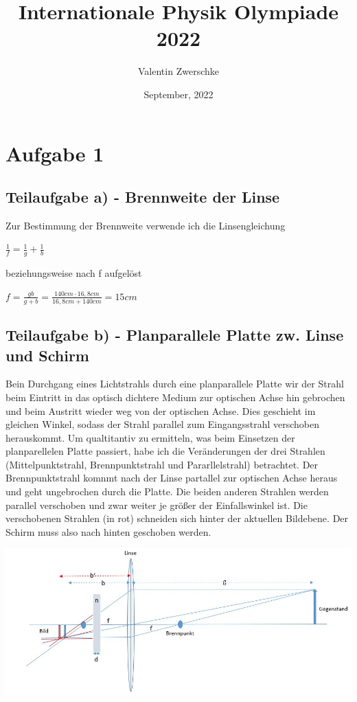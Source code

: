 \documentclass{article}
\title{Internationale Physik Olympiade 2022}
\author{Valentin Zwerschke}
\date{September, 2022}
\begin{document}
\maketitle
\section*{Aufgabe 1}
\subsection*{Teilaufgabe a) - Brennweite der Linse}
Zur Bestimmung der Brennweite verwende ich die Linsengleichung
\begin{center}
	$\frac{1}{f}=\frac{1}{g}+\frac{1}{b}$
\end{center}
beziehungsweise nach f aufgelöst
\begin{center}
	$f=\frac{gb}{g+b}=\frac{140cm\cdot16,8cm}{16,8cm+140cm}=15cm$
\end{center}
\subsection*{Teilaufgabe b) - Planparallele Platte zw. Linse und Schirm}
Bein Durchgang eines Lichtstrahls durch eine planparallele Platte wir der Strahl beim Eintritt in das optisch dichtere
Medium zur optischen Achse hin gebrochen und beim Austritt wieder weg von der optischen Achse. Dies geschieht im gleichen Winkel, 
sodass der Strahl parallel zum Eingangsstrahl verschoben herauskommt.   
Um qualtitantiv zu ermitteln, was beim Einsetzen der planparellelen Platte passiert, habe ich die Veränderungen der drei Strahlen (Mittelpunktstrahl, Brennpunktstrahl und Pararllelstrahl) betrachtet.
Der Brennpunktstrahl komnmt nach der Linse partallel zur optischen Achse heraus und geht ungebrochen durch die Platte. Die beiden anderen Strahlen werden parallel verschoben und zwar weiter je größer der Einfallswinkel ist. 
Die verschobenen Strahlen (in rot) schneiden sich hinter der aktuellen Bildebene. Der Schirm muss also nach hinten geschoben werden.
\begin{center}
	\includegraphics[scale=0.45]{Linse.JPG}
\end{center}
\end{document}
